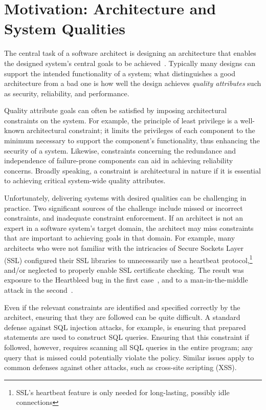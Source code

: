 \documentclass[runningheads]{llncs}
\begin{document}
\begin{sloppypar}
\section{Motivation: Architecture and System Qualities}
The central task of a software architect is designing an architecture that enables the designed system's central goals to be achieved~\cite{bass-software-architecture-in-practice}.  Typically many designs can support the intended functionality of a system; what distinguishes a good architecture from a bad one is how well the design achieves \emph{quality attributes} such as security, reliability, and performance.

Quality attribute goals can often be satisfied by imposing architectural constraints on the system.  For example, the principle of least privilege is a well-known architectural constraint; it limits the privileges of each component to the minimum necessary to support the component's functionality, thus enhancing the security of a system.  Likewise, constraints concerning the redundance and independence of failure-prone components can aid in achieving reliability concerns.  Broadly speaking, a constraint is architectural in nature if it is essential to achieving critical system-wide quality attributes.

Unfortunately, delivering systems with desired qualities can be challenging in practice.  Two significant sources of the challenge include missed or incorrect constraints, and inadequate constraint enforcement.  If an architect is not an expert in a software system's target domain, the architect may miss constraints that are important to achieving goals in that domain.  For example, many architects who were not familiar with the intricacies of Secure Sockets Layer (SSL) configured their SSL libraries to unnecessarily use a heartbeat protocol,\footnote{SSL's heartbeat feature is only needed for long-lasting, possibly idle connections} and/or neglected to properly enable SSL certificate checking.  The result was exposure to the Heartbleed bug in the first case~\cite{Heartbleed}, and to a man-in-the-middle attack in the second~\cite{most-dangerous-code-in-the-world}.

Even if the relevant constraints are identified and specified correctly by the architect, ensuring that they are followed can be quite difficult.  A standard defense against SQL injection attacks, for example, is ensuring that prepared statements are used to construct SQL queries.  Ensuring that this constraint if followed, however, requires scanning all SQL queries in the entire program; any query that is missed could potentially violate the policy.  Similar issues apply to common defenses against other attacks, such as cross-site scripting (XSS).



\end{sloppypar}
\end{document}
